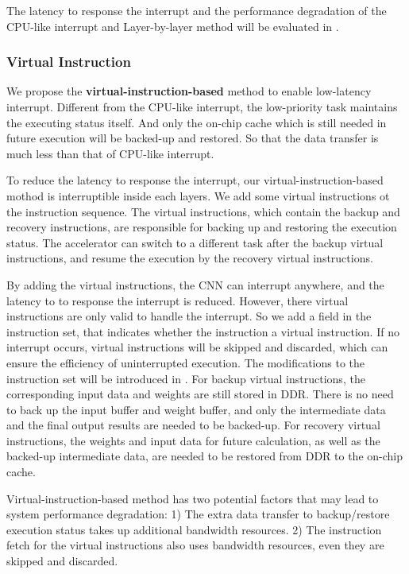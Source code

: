 The latency to response the interrupt and the performance degradation of the CPU-like interrupt and Layer-by-layer method will be evaluated in .

\subsubsection{Virtual Instruction}

We propose the \textbf{virtual-instruction-based} method to enable low-latency interrupt. Different from the CPU-like interrupt, the low-priority task maintains the executing status itself. And only the on-chip cache which is still needed in future execution will be backed-up and restored. So that the data transfer is much less than that of CPU-like interrupt.

To reduce the latency to response the interrupt, our virtual-instruction-based mothod is interruptible inside each layers. We add some virtual instructions ot the instruction sequence.
The virtual instructions, which contain the backup and recovery instructions, are responsible for backing up and restoring the execution status. The accelerator can switch to a different task after the backup virtual instructions, and resume the execution by the recovery virtual instructions.

By adding the virtual instructions, the CNN can interrupt anywhere, and the latency to to response the interrupt is reduced. However, there virtual instructions are only valid to handle the interrupt. So we add a field in the instruction set, that indicates whether the instruction a virtual instruction. If no interrupt occurs, virtual instructions will be skipped and discarded, which can ensure the efficiency of uninterrupted execution. The modifications to the instruction set will be introduced in . 
For backup virtual instructions, the corresponding input data and weights are still stored in DDR. 
There is no need to back up the input buffer and weight buffer, and only the intermediate data and the final output results are needed to be backed-up. 
For recovery virtual instructions, the weights and input data for future calculation, as well as the backed-up intermediate data, are needed to be restored from DDR to the on-chip cache.

Virtual-instruction-based method has two potential factors that may lead to system performance degradation: 1) The extra data transfer to backup/restore execution status takes up additional bandwidth resources. 2) The instruction fetch for the virtual instructions also uses bandwidth resources, even they are skipped and discarded.

